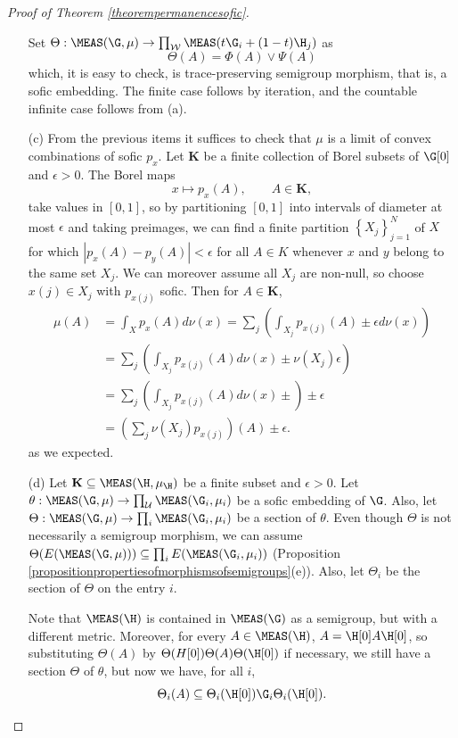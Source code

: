 \begin{proof}[Proof of Theorem \ref{theorempermanencesofic}]
\begin{enumerate}
Set $\Theta:\MEAS(\G,\mu)\to\prod_\mathcal{W}\MEAS(t\G_i+(1-t)\H_j)$ as
\[\Theta(A)=\Phi(A)\lor \Psi(A)\]
which, it is easy to check, is trace-preserving semigroup morphism, that is, a sofic embedding. The finite case follows by iteration, and the countable infinite case follows from (a).
%
\item[(c)] From the previous items it suffices to check that $\mu$ is a limit of convex combinations of sofic $p_x$. Let $\mathbf{K}$ be a finite collection of Borel subsets of $\G[0]$ and $\epsilon>0$. The Borel maps
\[x\mapsto p_x(A),\qquad A\in \mathbf{K},\]
take values in $[0,1]$, so by partitioning $[0,1]$ into intervals of diameter at most $\epsilon$ and taking preimages, we can find a finite partition $\left\{X_j\right\}_{j=1}^N$ of $X$ for which $|p_x(A)-p_y(A)|<\epsilon$ for all $A\in K$ whenever $x$ and $y$ belong to the same set $X_j$. We can moreover assume all $X_j$ are non-null, so choose $x(j)\in X_j$ with $p_{x(j)}$ sofic. Then for $A\in\mathbf{K}$,
\begin{align*}
\mu(A)&=\int_Xp_x(A)d\nu(x)=\sum_j\left(\int_{X_j}p_{x(j)}(A)\pm\epsilon d\nu(x)\right)\\
&=\sum_j\left(\int_{X_j}p_{x(j)}(A)d\nu(x)\pm\nu(X_j)\epsilon\right)\\
&=\sum_j\left(\int_{X_j}p_{x(j)}(A)d\nu(x)\pm\right)\pm\epsilon\\
&=\left(\sum_j\nu(X_j)p_{x(j)}\right)(A)\pm\epsilon.
\end{align*}
as we expected.
%
\item[(d)] Let $\mathbf{K}\subseteq \MEAS(\H,\mu_{\H})$ be a finite subset and $\epsilon>0$. Let $\theta:\MEAS(\G,\mu)\to \prod_\mathcal{U}\MEAS(\G_i,\mu_i)$ be a sofic embedding of $\G$. Also, let $\Theta:\MEAS(\G,\mu)\to\prod_i\MEAS(\G_i,\mu_i)$ be a section of $\theta$. Even though $\Theta$ is not necessarily a semigroup morphism, we can assume $\Theta(E(\MEAS(\G,\mu)))\subseteq \prod_iE(\MEAS(\G_i,\mu_i))$ (Proposition \ref{propositionpropertiesofmorphismsofsemigroups}(e)). Also, let $\Theta_i$ be the section of $\Theta$ on the entry $i$.

Note that $\MEAS(\H)$ is contained in $\MEAS(\G)$ as a semigroup, but with a different metric. Moreover, for every $A\in\MEAS(\H)$, $A=\H[0]A\H[0]$, so substituting $\Theta(A)$ by $\Theta(H[0])\Theta(A)\Theta(\H[0])$ if necessary, we still have a section $\Theta$ of $\theta$, but now we have, for all $i$,
\[\Theta_i(A)\subseteq \Theta_i(\H[0])\G_i\Theta_i(\H[0]).\]


\end{enumerate}
\end{proof}
